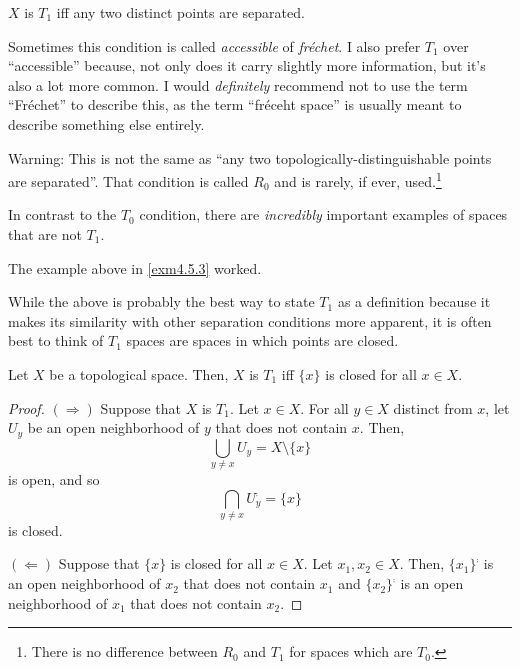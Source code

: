 \begin{dfn}[$T_1$]\label{T1}
$X$ is \emph{$T_1$} iff any two distinct points are separated.
\begin{rmk}
Sometimes this condition is called \emph{accessible} of \emph{fr\'{e}chet}.  I also prefer $T_1$ over ``accessible'' because, not only does it carry slightly more information, but it's also a lot more common.  I would \emph{definitely} recommend not to use the term ``Fr\'{e}chet'' to describe this, as the term ``fr\'{e}ceht space'' is usually meant to describe something else entirely.
\end{rmk}
\begin{rmk}
Warning:  This is not the same as ``any two topologically-distinguishable points are separated''.  That condition is called $R_0$ and is rarely, if ever, used.\footnote{There is no difference between $R_0$ and $T_1$ for spaces which are $T_0$.}
\end{rmk}
\begin{rmk}
In contrast to the $T_0$ condition, there are \emph{incredibly} important examples of spaces that are not $T_1$.
\end{rmk}
\end{dfn}
\begin{exm}
The example above in \cref{exm4.5.3} worked.
\end{exm}
While the above is probably the best way to state $T_1$ as a definition because it makes its similarity with other separation conditions more apparent, it is often best to think of $T_1$ spaces are spaces in which points are closed.
\begin{prp}\label{prp4.5.32}
Let $X$ be a topological space.  Then, $X$ is $T_1$ iff $\{ x\}$ is closed for all $x\in X$.
\begin{proof}
$(\Rightarrow )$ Suppose that $X$ is $T_1$.  Let $x\in X$.  For all $y\in X$ distinct from $x$, let $U_y$ be an open neighborhood of $y$ that does not contain $x$.  Then,
\begin{equation}
\bigcup _{y\neq x}U_y=X\setminus \{ x\}
\end{equation}
is open, and so
\begin{equation}
\bigcap _{y\neq x}U_y^{\comp}=\{ x\}
\end{equation}
is closed.

\blankline
\noindent
$(\Leftarrow )$ Suppose that $\{ x\}$ is closed for all $x\in X$.  Let $x_1,x_2\in X$.  Then, $\{ x_1\} ^{\comp}$ is an open neighborhood of $x_2$ that does not contain $x_1$ and $\{ x_2\} ^{\comp}$ is an open neighborhood of $x_1$ that does not contain $x_2$.
\end{proof}
\end{prp}
